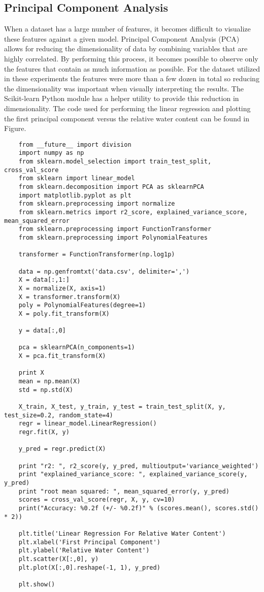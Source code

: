 \subsection{Principal Component Analysis}
When a dataset has a large number of features, it becomes difficult to visualize these features against a given model.  Principal Component Analysis (PCA) allows for reducing the dimensionality of data by combining variables that are highly correlated. By performing this process, it becomes possible to observe only the features that contain as much information as possible.  For the dataset utilized in these experiments the features were more than a few dozen in total so reducing the dimensionality was important when visually interpreting the results. The Scikit-learn Python module has a helper utility to provide this reduction in dimensionality.  The code used for performing the linear regression and plotting the first principal component versus the relative water content can be found in Figure.
\begin{lstlisting}
    from __future__ import division
    import numpy as np
    from sklearn.model_selection import train_test_split, cross_val_score
    from sklearn import linear_model
    from sklearn.decomposition import PCA as sklearnPCA
    import matplotlib.pyplot as plt
    from sklearn.preprocessing import normalize
    from sklearn.metrics import r2_score, explained_variance_score, mean_squared_error
    from sklearn.preprocessing import FunctionTransformer
    from sklearn.preprocessing import PolynomialFeatures

    transformer = FunctionTransformer(np.log1p)

    data = np.genfromtxt('data.csv', delimiter=',')
    X = data[:,1:]
    X = normalize(X, axis=1)
    X = transformer.transform(X)
    poly = PolynomialFeatures(degree=1)
    X = poly.fit_transform(X)

    y = data[:,0]

    pca = sklearnPCA(n_components=1)
    X = pca.fit_transform(X)

    print X
    mean = np.mean(X)
    std = np.std(X)

    X_train, X_test, y_train, y_test = train_test_split(X, y, test_size=0.2, random_state=4)
    regr = linear_model.LinearRegression()
    regr.fit(X, y)

    y_pred = regr.predict(X)

    print "r2: ", r2_score(y, y_pred, multioutput='variance_weighted')
    print "explained_variance_score: ", explained_variance_score(y, y_pred)
    print "root mean squared: ", mean_squared_error(y, y_pred)
    scores = cross_val_score(regr, X, y, cv=10)
    print("Accuracy: %0.2f (+/- %0.2f)" % (scores.mean(), scores.std() * 2))

    plt.title('Linear Regression For Relative Water Content')
    plt.xlabel('First Principal Component')
    plt.ylabel('Relative Water Content')
    plt.scatter(X[:,0], y)
    plt.plot(X[:,0].reshape(-1, 1), y_pred)

    plt.show()
\end{lstlisting}
